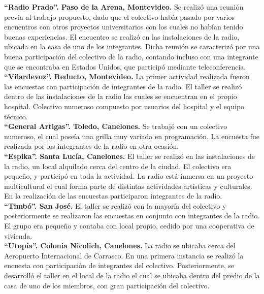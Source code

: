 \textbf{“Radio Prado”. Paso de la Arena, Montevideo.} Se realizó una reunión previa al trabajo propuesto, dado que el colectivo había pasado por varios encuentros con otros proyectos universitarios con los cuales no habían tenido buenas experiencias. El encuentro se realizó en las instalaciones de la radio, ubicada en la casa de uno de los integrantes. Dicha reunión se caracterizó por una buena participación del colectivo de la radio, contando incluso con una integrante que se encontraba en Estados Unidos, que participó mediante teleconferencia.\\

\textbf{“Vilardevoz”. Reducto, Montevideo.} La primer actividad realizada fueron las encuestas con participación de integrantes de la radio. El taller se realizó dentro de las instalaciones de la radio las cuales se encuentran en el propio hospital. Colectivo numeroso compuesto por usuarios del hospital y el equipo técnico.\\

\textbf{“General Artigas”. Toledo, Canelones.} Se trabajó con un colectivo numeroso, el cual poseía una grilla muy variada en programación. La encuesta fue realizada por los integrantes de la radio en otra ocasión.\\

\textbf{“Espika”. Santa Lucía, Canelones.} El taller se realizó en las instalaciones de la radio, un local alquilado cerca del centro de la ciudad. El colectivo era pequeño, y participó en toda la actividad. La radio está inmersa en un proyecto multicultural el cual forma parte de distintas actividades artísticas y culturales. En la realización de las encuestas participaron integrantes de la radio.\\

\textbf{“Timbó”. San José.} El taller se realizó con la mayoría del colectivo y posteriormente se realizaron las encuestas en conjunto con integrantes de la radio. El grupo era pequeño y contaba con local propio, cedido por una cooperativa de vivienda.\\

\textbf{“Utopía”. Colonia Nicolich, Canelones.} La radio se ubicaba cerca del Aeropuerto Internacional de Carrasco. En una primera instancia se realizó la encuesta con participación de integrantes del colectivo. Posteriormente, se desarrolló el taller en el local de la radio el cual se ubicaba dentro del predio de la casa de uno de los miembros, con gran participación del colectivo.\\

